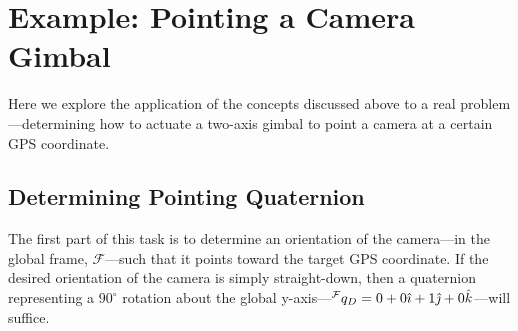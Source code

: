 \documentclass[letterpaper,10pt]{article}
\newcommand\leftidx[3]{%
  {\vphantom{#2}}#1#2#3%
}
\begin{document}



\section{Example: Pointing a Camera Gimbal}
Here we explore the application of the concepts discussed above to a real problem---determining how to actuate a two-axis gimbal to point a camera at a certain GPS coordinate.

\subsection{Determining Pointing Quaternion}
The first part of this task is to determine an orientation of the camera---in the global frame, $\mathcal{F}$---such that it points toward the target GPS coordinate. If the desired orientation of the camera is simply straight-down, then a quaternion representing a $90^\circ$ rotation about the global y-axis---$\leftidx{^\mathcal{F}}{q}{_{D}} = 0 + 0\hat{\imath} + 1 \hat{\jmath} + 0 \hat{k}$---will suffice.
\end{document}
